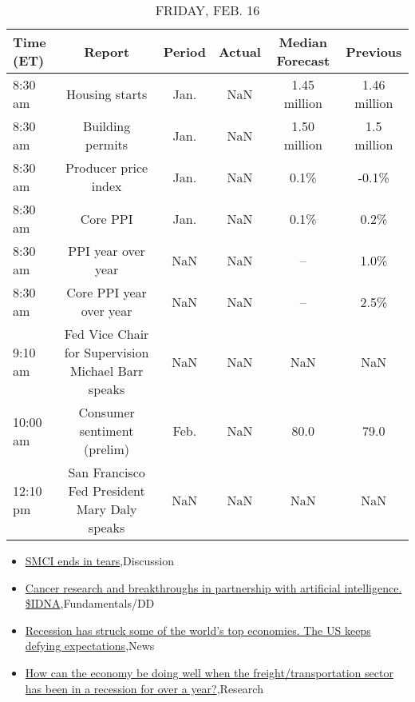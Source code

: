 \documentclass{article}%
\begin{document}
%


\begin{table}[htbp]%
\caption{FRIDAY, FEB. 16}%
\centering%
\begin{adjustbox}{width=1\textwidth}%
\begin{tabular}{lccccc}
\toprule
Time (ET) &                                             Report & Period & Actual & Median Forecast &     Previous \\
\midrule
  8:30 am &                                     Housing starts &   Jan. &    NaN &    1.45 million & 1.46 million \\
  8:30 am &                                   Building permits &   Jan. &    NaN &    1.50 million &  1.5 million \\
  8:30 am &                               Producer price index &   Jan. &    NaN &            0.1\% &        -0.1\% \\
  8:30 am &                                           Core PPI &   Jan. &    NaN &            0.1\% &         0.2\% \\
  8:30 am &                                 PPI year over year &    NaN &    NaN &              -- &         1.0\% \\
  8:30 am &                            Core PPI year over year &    NaN &    NaN &              -- &         2.5\% \\
  9:10 am & Fed Vice Chair for Supervision Michael Barr speaks &    NaN &    NaN &             NaN &          NaN \\
 10:00 am &                        Consumer sentiment (prelim) &   Feb. &    NaN &            80.0 &         79.0 \\
 12:10 pm &       San Francisco Fed President Mary Daly speaks &    NaN &    NaN &             NaN &          NaN \\
\bottomrule
\end{tabular}
%
\end{adjustbox}%
\end{table}

%
\begin{itemize}%
\item%
\href{https://reddit.com/r/wallstreetbets/comments/1as6yfr/smci\_ends\_in\_tears/}{SMCI ends in tears},Discussion%
\item%
\href{https://reddit.com/r/StockMarket/comments/1arws8m/cancer\_research\_and\_breakthroughs\_in\_partnership/}{Cancer research and breakthroughs in partnership with artificial intelligence. \$IDNA},Fundamentals/DD%
\item%
\href{https://reddit.com/r/Economics/comments/1as6jyr/recession\_has\_struck\_some\_of\_the\_worlds\_top/}{Recession has struck some of the world's top economies. The US keeps defying expectations},News%
\item%
\href{https://reddit.com/r/Economics/comments/1arujrb/how\_can\_the\_economy\_be\_doing\_well\_when\_the/}{How can the economy be doing well when the freight/transportation sector has been in a recession for over a year?},Research%
\end{itemize}%
\end{document}
